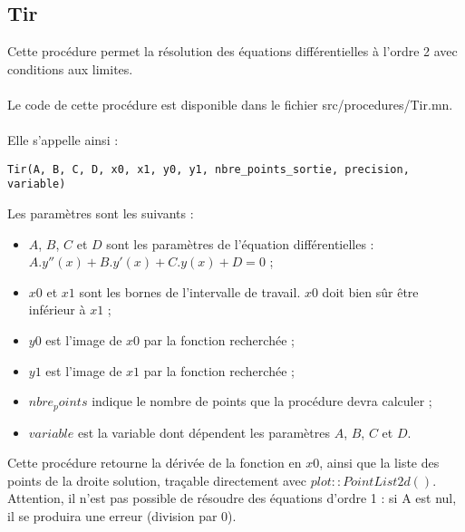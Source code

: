 \documentclass{report}
\begin{document}
\subsection{Tir}
Cette procédure permet la résolution des équations différentielles à l'ordre 2 avec conditions aux limites.
\\
\\
Le code de cette procédure est disponible dans le fichier src/procedures/Tir.mn.
\\
\\
Elle s'appelle ainsi :
\begin{verbatim}
Tir(A, B, C, D, x0, x1, y0, y1, nbre_points_sortie, precision, variable)
\end{verbatim}
Les paramètres sont les suivants : 
\begin{itemize}
	\item $A$, $B$, $C$ et $D$ sont les paramètres de l'équation différentielles : $A.y''(x) + B.y'(x) + C.y(x) + D = 0$ ;
	\item $x0$ et $x1$ sont les bornes de l'intervalle de travail. $x0$ doit bien sûr être inférieur à $x1$ ;
	\item $y0$ est l'image de $x0$ par la fonction recherchée ;
	\item $y1$ est l'image de $x1$ par la fonction recherchée ;
	\item $nbre_points$ indique le nombre de points que la procédure devra calculer ;
	\item $variable$ est la variable dont dépendent les paramètres $A$, $B$, $C$ et $D$.
\end{itemize}

Cette procédure retourne la dérivée de la fonction en $x0$, ainsi que la liste des points de la droite solution, traçable directement avec $plot::PointList2d()$. Attention, il n'est pas possible de résoudre des équations d'ordre 1 : si A est nul, il se produira une erreur (division par 0).
\end{document}

